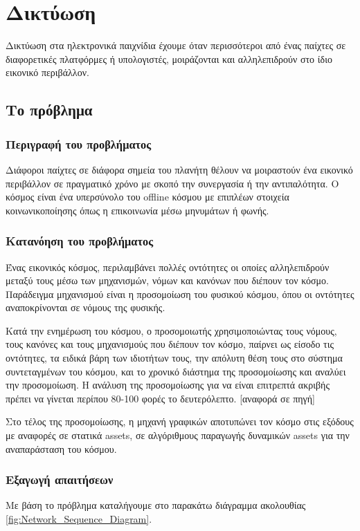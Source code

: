 	\chapter{Δικτύωση}
		Δικτύωση στα ηλεκτρονικά παιχνίδια έχουμε όταν περισσότεροι από ένας παίχτες σε διαφορετικές πλατφόρμες ή υπολογιστές, μοιράζονται και αλληλεπιδρούν στο ίδιο εικονικό περιβάλλον. 
		
		\section{Το πρόβλημα}
		\subsection{Περιγραφή του προβλήματος}
		Διάφοροι παίχτες σε διάφορα σημεία του πλανήτη θέλουν να μοιραστούν ένα εικονικό περιβάλλον σε πραγματικό χρόνο με σκοπό την συνεργασία ή την αντιπαλότητα. O κόσμος είναι ένα υπερσύνολο του offline κόσμου με επιπλέων στοιχεία κοινωνικοποίησης όπως η επικοινωνία μέσω μηνυμάτων ή φωνής.
		
		\subsection{Κατανόηση του προβλήματος}
		
		Ένας εικονικός κόσμος, περιλαμβάνει πολλές οντότητες οι  οποίες αλληλεπιδρούν μεταξύ τους μέσω των μηχανισμών, νόμων και κανόνων που διέπουν τον κόσμο. Παράδειγμα μηχανισμού είναι η προσομοίωση του φυσικού κόσμου, όπου οι οντότητες αναποκρίνονται σε νόμους της φυσικής.
		
	    Κατά την ενημέρωση του κόσμου, ο προσομοιωτής χρησιμοποιώντας  τους νόμους, τους κανόνες και τους μηχανισμούς που διέπουν τον κόσμο, παίρνει ως είσοδο τις οντότητες, τα ειδικά βάρη των ιδιοτήτων τους, την απόλυτη θέση τους στο σύστημα συντεταγμένων του κόσμου, και το χρονικό διάστημα της προσομοίωσης και αναλύει την προσομοίωση. Η ανάλυση της προσομοίωσης για να είναι επιτρεπτά ακριβής πρέπει να γίνεται περίπου 80-100 φορές το δευτερόλεπτο. [αναφορά σε πηγή]
		
		Στο τέλος της προσομοίωσης, η μηχανή γραφικών αποτυπώνει τον κόσμο στις εξόδους με αναφορές σε στατικά assets, σε αλγόριθμους παραγωγής δυναμικών assets για την αναπαράσταση του κόσμου.
	
		\subsection{Εξαγωγή απαιτήσεων}	
		Με βάση το πρόβλημα καταλήγουμε στο παρακάτω διάγραμμα ακολουθίας \ref{fig:Network_Sequence_Diagram}.
		
